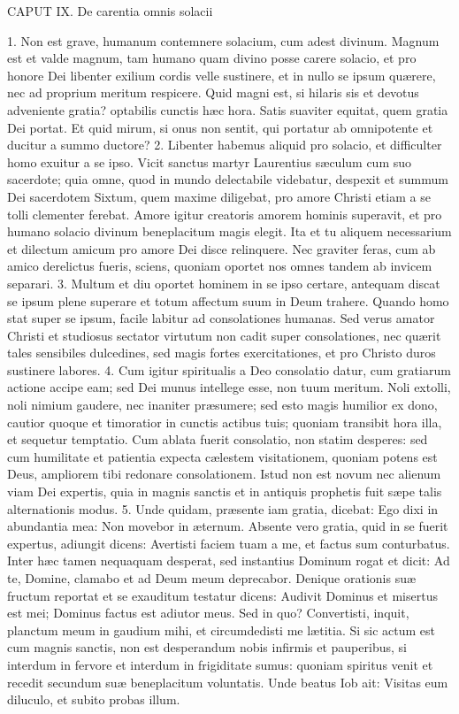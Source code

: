 \documentclass[twoside]{article}
\begin{document}
CAPUT IX.
De carentia omnis solacii

1. Non est grave, humanum contemnere solacium, cum adest divinum. Magnum est et valde magnum, tam humano quam divino posse carere solacio, et pro honore Dei libenter exilium cordis velle sustinere, et in nullo se ipsum quærere, nec ad proprium meritum respicere. Quid magni est, si hilaris sis et devotus adveniente gratia? optabilis cunctis hæc hora. Satis suaviter equitat, quem gratia Dei portat. Et quid mirum, si onus non sentit, qui portatur ab omnipotente et ducitur a summo ductore?
2. Libenter habemus aliquid pro solacio, et difficulter homo exuitur a se ipso. Vicit sanctus martyr Laurentius sæculum cum suo sacerdote; quia omne, quod in mundo delectabile videbatur, despexit et summum Dei sacerdotem Sixtum, quem maxime diligebat, pro amore Christi etiam a se tolli clementer ferebat. Amore igitur creatoris amorem hominis superavit, et pro humano solacio divinum beneplacitum magis elegit. Ita et tu aliquem necessarium et dilectum amicum pro amore Dei disce relinquere. Nec graviter feras, cum ab amico derelictus fueris, sciens, quoniam oportet nos omnes tandem ab invicem separari.
3. Multum et diu oportet hominem in se ipso certare, antequam discat se ipsum plene superare et totum affectum suum in Deum trahere. Quando homo stat super se ipsum, facile labitur ad consolationes humanas. Sed verus amator Christi et studiosus sectator virtutum non cadit super consolationes, nec quærit tales sensibiles dulcedines, sed magis fortes exercitationes, et pro Christo duros sustinere labores.
4. Cum igitur spiritualis a Deo consolatio datur, cum gratiarum actione accipe eam; sed Dei munus intellege esse, non tuum meritum. Noli extolli, noli nimium gaudere, nec inaniter præsumere; sed esto magis humilior ex dono, cautior quoque et timoratior in cunctis actibus tuis; quoniam transibit hora illa, et sequetur temptatio. Cum ablata fuerit consolatio, non statim desperes: sed cum humilitate et patientia expecta cælestem visitationem, quoniam potens est Deus, ampliorem tibi redonare consolationem. Istud non est novum nec alienum viam Dei expertis, quia in magnis sanctis et in antiquis prophetis fuit sæpe talis alternationis modus.
5. Unde quidam, præsente iam gratia, dicebat: Ego dixi in abundantia mea: Non movebor in æternum. Absente vero gratia, quid in se fuerit expertus, adiungit dicens: Avertisti faciem tuam a me, et factus sum conturbatus. Inter hæc tamen nequaquam desperat, sed instantius Dominum rogat et dicit: Ad te, Domine, clamabo et ad Deum meum deprecabor. Denique orationis suæ fructum reportat et se exauditum testatur dicens: Audivit Dominus et misertus est mei; Dominus factus est adiutor meus. Sed in quo? Convertisti, inquit, planctum meum in gaudium mihi, et circumdedisti me lætitia. Si sic actum est cum magnis sanctis, non est desperandum nobis infirmis et pauperibus, si interdum in fervore et interdum in frigiditate sumus: quoniam spiritus venit et recedit secundum suæ beneplacitum voluntatis. Unde beatus Iob ait: Visitas eum diluculo, et subito probas illum.
\end{document}
